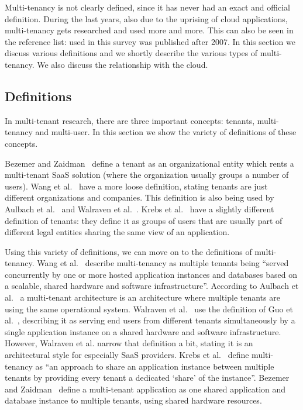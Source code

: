 Multi-tenancy is not clearly defined, since it has never had an exact and official definition. During the last years, also due to the uprising of cloud applications, multi-tenancy gets researched and used more and more. This can also be seen in the reference list:  used in this survey was published after 2007. In this section we discuss various definitions and we shortly describe the various types of multi-tenancy. We also discuss the relationship with the cloud.

\subsection{Definitions}

In multi-tenant research, there are three important concepts: tenants, multi-tenancy and multi-user. In this section we show the variety of definitions of these concepts.

Bezemer and Zaidman~\cite{bezemer2010multi} define a tenant as an organizational entity which rents a multi-tenant \ac{SaaS} solution (where the organization usually groups a number of users). Wang et al.~\cite{wang2008study} have a more loose definition, stating tenants are just different organizations and companies. This definition is also being used by Aulbach et al.~\cite{aulbach2008multi} and Walraven et al.~\cite{walraven2012towards}. Krebs et al.~\cite{krebs2012architecture} have a slightly different definition of tenants: they define it as groups of users that are usually part of different legal entities sharing the same view of an application.

Using this variety of definitions, we can move on to the definitions of multi-tenancy. Wang et al.~\cite{wang2008study} describe multi-tenancy as multiple tenants being ``served concurrently by one or more hosted application instances and databases based on a scalable, shared hardware and software infrastructure''. According to Aulbach et al.~\cite{aulbach2008multi} a multi-tenant architecture is an architecture where multiple tenants are using the same operational system. Walraven et al.~\cite{walraven2012towards} use the definition of Guo et al.~\cite{guo2007framework}, describing it as serving end users from different tenants simultaneously by a single application instance on a shared hardware and software infrastructure. However, Walraven et al. narrow that definition a bit, stating it is an architectural style for especially \ac{SaaS} providers. Krebs et al.~\cite{krebs2012architecture} define multi-tenancy as ``an approach to share an application instance between multiple tenants by providing every tenant a dedicated `share' of the instance''. Bezemer and Zaidman~\cite{bezemer2010multi} define a multi-tenant application as one shared application and database instance to multiple tenants, using shared hardware resources.

